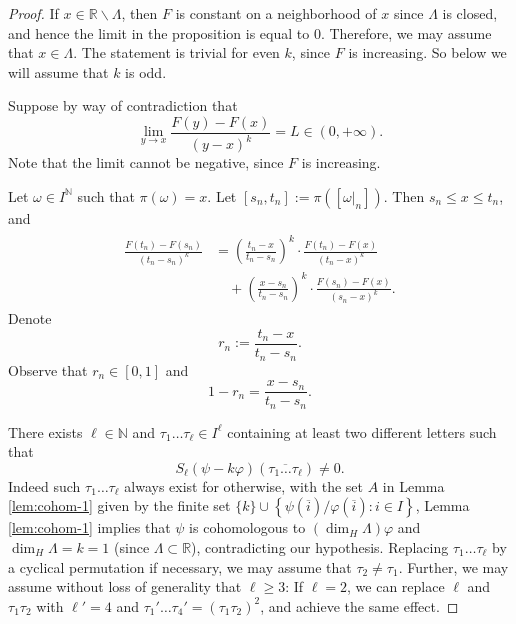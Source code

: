 \documentclass[11pt]{amsart}
\newcommand\RR{\mathbb{R}}
\newcommand{\1}{1}
\newcommand{\N}{\mathbb{N}}
\begin{document}
\begin{proof}%
{If $x\in\RR\backslash\Lambda$, then $F$ is constant on a neighborhood of $x$ since $\Lambda$ is closed, and hence the limit in the proposition is equal to $0$. Therefore, we may assume that $x\in\Lambda$.}
The statement is trivial for even $k$, since $F$ is increasing. So below we will assume that $k$ is odd.

Suppose by way of contradiction that 
\[
\lim_{y\rightarrow x}\frac{F(y)-F(x)}{(y-x)^{k}}=L\in(0,+\infty).
\]
Note that the limit cannot be negative, since $F$ is increasing.

Let $\omega \in I^\N$ such that $\pi(\omega)=x$.
Let $[s_n,t_n]:=\pi\left(\left[\omega|_{n}\right]\right)$. Then $s_n\leq x\leq t_n$, and
\begin{align}
\begin{split}
\frac{F(t_{n})-F(s_{n})}{(t_{n}-s_{n})^{k}} & =\left(\frac{t_{n}-x}{t_{n}-s_{n}}\right)^{k}\cdot\frac{F(t_{n})-F(x)}{(t_{n}-x)^{k}}\\
 & \quad+\left(\frac{x-s_{n}}{t_{n}-s_{n}}\right)^{k}\cdot\frac{F(s_{n})-F(x)}{(s_{n}-x)^{k}}.
\end{split}
\label{eq:secant-slope}
\end{align}
Denote 
$$r_{n}:=\frac{t_{n}-x}{t_{n}-s_{n}}.$$ 
Observe that $r_n\in[0,1]$ and
$$1-r_{n}=\frac{x-s_{n}}{t_{n}-s_{n}}.$$

There exists  $\ell\in\mathbb{N}$ and $\tau_{1}\dots \tau_{\ell}\in I^\ell$
containing at least two different letters such that 
\[
S_{\ell}(\psi-k\varphi)\left(\overline{\tau_{1}\dots \tau_{\ell}}\right)\neq0.
\]
Indeed such $\tau_{1}\dots \tau_{\ell}$ always exist for otherwise, with the set  $A$ in Lemma \ref{lem:cohom-1} given by the finite set $\{k\}\cup\left\{ \psi(\overline{i})/\varphi(\overline{i}):i\in I\right\}$, Lemma \ref{lem:cohom-1} implies that $\psi$ is cohomologous to $(\dim_{H}\Lambda)\varphi$
and $\dim_{H}\Lambda=k=1$ {(since $\Lambda\subset\RR$)}, contradicting our hypothesis. Replacing $\tau_1\dots\tau_\ell$ by a cyclical permutation if necessary, we may assume that $\tau_2\neq\tau_1$. {Further, we may assume without loss of generality that $\ell\geq 3$: If $\ell=2$, we can replace $\ell$ and $\tau_1\tau_2$ with $\ell'=4$ and $\tau_1'\dots\tau_4'=(\tau_1\tau_2)^2$, and achieve the same effect.}


\end{proof}
\end{document}
